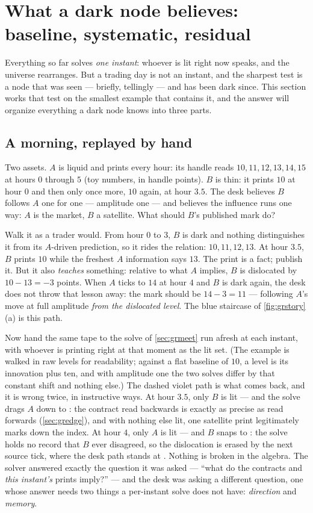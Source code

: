 \section{What a dark node believes: baseline, systematic, residual}
\label{sec:grbelieve}

Everything so far solves \emph{one instant}: whoever is lit right now
speaks, and the universe rearranges.  But a trading day is not an
instant, and the sharpest test is a node that was
seen --- briefly, tellingly --- and has been dark since.  This section
works that test on the smallest example that contains it, and the
answer will organize everything a dark node knows into three parts.

\subsection{A morning, replayed by hand}

Two assets.  $A$ is liquid and prints every hour: its handle reads
$10,11,12,13,14,15$ at hours $0$ through $5$ (toy numbers, in handle
points).  $B$ is thin: it prints $10$ at hour $0$ and then only once
more, $10$ again, at hour $3.5$.  The desk believes $B$ follows $A$
one for one --- amplitude one --- and believes the influence runs one
way: $A$ is the market, $B$ a satellite.  What should $B$'s published
mark do?

Walk it as a trader would.  From hour $0$ to $3$, $B$ is dark and
nothing distinguishes it from its $A$-driven prediction, so it rides
the relation: $10,11,12,13$.  At hour $3.5$, $B$ prints $10$ while the
freshest $A$ information says $13$.  The print is a fact; publish it.
But it also \emph{teaches} something: relative to what $A$ implies,
$B$ is dislocated by $10-13=-3$ points.  When $A$ ticks to $14$ at
hour $4$ and $B$ is dark again, the desk does not throw that lesson
away: the mark should be $14-3=11$ --- following $A$'s move at full
amplitude \emph{from the dislocated level}.  The blue staircase of
\cref{fig:grstory}(a) is this path.

Now hand the same tape to the solve of
\cref{sec:grmeet} run afresh at each instant, with whoever is printing
right at that moment as the lit set.  (The example is walked in raw
levels for readability; against a flat baseline of $10$, a level is
its innovation plus ten, and with amplitude one the two solves differ
by that constant shift and nothing else.)  The dashed violet path is
what comes back, and it is wrong twice, in instructive ways.  At hour
$3.5$, only $B$ is lit --- and the solve drags $A$ down to
\MacGrStorySnapA: the contract read backwards is exactly as precise as
read forwards (\cref{sec:gredge}), and with nothing else lit, one
satellite print legitimately marks down the index.  At hour $4$, only
$A$ is lit --- and $B$ snaps to \MacGrStorySnapB: the solve holds no
record that $B$ ever disagreed, so the dislocation is erased by the
next source tick, where the desk path stands at \MacGrStoryDeskB.
Nothing is broken in the algebra.  The solver answered exactly the
question it was asked --- ``what do the contracts and \emph{this
instant's} prints imply?'' --- and the desk was asking a different
question, one whose answer needs two things a per-instant solve does
not have: \emph{direction} and \emph{memory}.

